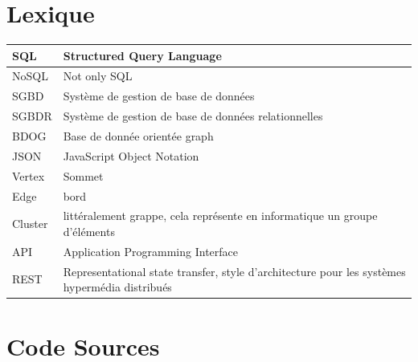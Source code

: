 \documentclass[a4paper,fleqn,12pt]{report}
\begin{document}
\chapter*{Lexique}
\begin{center}
\begin{tabular}[c]{ l p{14cm} }
 SQL  & Structured Query Language \\ \hline
 NoSQL  & Not only SQL \\ \hline
 SGBD  & Système de gestion de base de données \\ \hline
 SGBDR  & Système de gestion de base de données relationnelles \\ \hline
 BDOG  & Base de donnée orientée graph \\ \hline
 JSON  & JavaScript Object Notation \\ \hline
 Vertex  & Sommet \\ \hline
 Edge  & bord \\ \hline
 Cluster  & littéralement grappe, cela représente en informatique un groupe d'éléments \\ \hline
 API  & Application Programming Interface  \\ \hline
 REST  & Representational state transfer, style d'architecture pour les systèmes hypermédia distribués \\ \hline
\end{tabular}
\end{center}

\chapter*{Code Sources}

%
\end{document}
